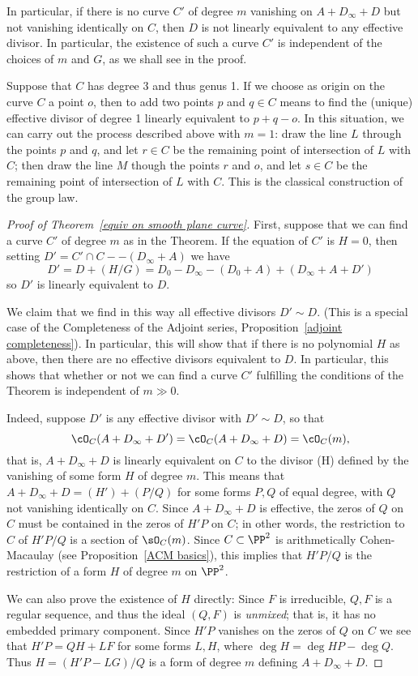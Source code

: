In particular,  if there is no curve $C'$ of degree $m$ vanishing on  $A + D_\infty + D$ but not vanishing identically on $C$, then $D$ is not linearly equivalent to any effective divisor. In particular, the existence of such a curve $C'$ is independent of the choices of $m$ and $G$, as we shall see in the proof.

\begin{example}
Suppose that $C$ has degree 3 and thus genus 1. If we choose as origin on the curve $C$ a point $o$, then to add two points $p$ and $q \in C$ means to find the (unique) effective divisor of degree 1 linearly equivalent to $p + q - o$. In this situation, we can carry out the process described above with $m=1$: draw the line $L$ through the points $p$ and $q$, and let $r \in C$ be the remaining point of intersection of $L$ with $C$; then draw the line $M$ though the points $r$ and $o$, and let $s \in C$ be the remaining point of intersection of $L$ with $C$. This is the classical construction of the group law.
\end{example}

\begin{proof}[Proof of Theorem~\ref{equiv on smooth plane curve}]
First, suppose that we can find a curve $C'$ of degree $m$ as in the Theorem. If the equation of $C'$ is $H=0$,
then  setting $D' = C'\cap C - -(D_\infty+A)$ we have
$$
D' = D + (H/G) = D_0- D_\infty - (D_0+A)+(D_\infty+A+D')
$$
so $D'$ is linearly equivalent to $D$. 

We claim that we find in this way all effective divisors $D' \sim D$. (This is a special case of the Completeness of the Adjoint series, Proposition~\ref{adjoint completeness}). In particular, this will show that if there is no polynomial $H$ as above, then there are no effective divisors equivalent to $D$. In particular, this shows
that whether or not we can find a curve $C'$ fulfilling the conditions of the Theorem is independent of $m\gg 0$.

Indeed, suppose $D'$ is any effective divisor with $D' \sim D$, so that
$$
\cO_C(A+D_\infty+D') = \cO_C(A+D_\infty+D)  = \cO_C(m),
$$
that is, $A+D_\infty+D$ is linearly equivalent on $C$ to the divisor (H) defined by the vanishing of some form $H$ of degree $m$. 
This means that
$A+D_\infty+D  = (H') +(P/Q)$ for some forms $P,Q$ of equal degree, with $Q$ not vanishing identically on $C$. 
Since $A+D_\infty+D$ is effective,
the zeros of $Q$ on $C$ must be contained in the zeros of $H'P$ on $C$; in other words,
the restriction to $C$ of $H'P/Q$ is a section of $\sO_C(m)$.
Since $C\subset \PP^2$ is arithmetically Cohen-Macaulay (see Proposition~\ref{ACM basics}), this implies that
$H'P/Q$ is the restriction of a form $H$ of degree $m$ on $\PP^2$.

We can also prove the existence of $H$ directly: Since $F$ is irreducible, 
$Q,F$ is a regular sequence, and thus the ideal $(Q,F)$ is \emph{unmixed}; that is, it has no embedded primary component.
Since $H'P$ vanishes on the zeros of $Q$ on $C$ we see that $H'P = QH+LF$ for some
forms $L,H$, where $\deg H = \deg HP - \deg Q$. Thus $H = (H'P- LG)/Q$ is a form
of degree $m$ defining $A+D_\infty+D$.
\end{proof}

